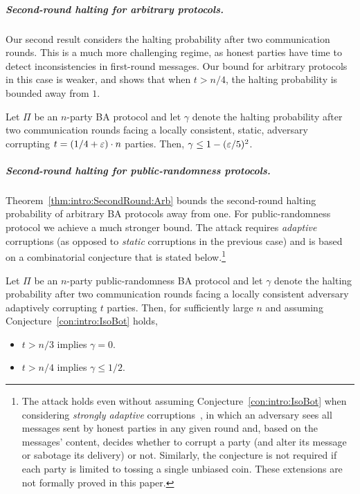 \subparagraph{Second-round halting for arbitrary protocols.}
Our second result considers the halting probability after two communication rounds.
This is a much more challenging regime, as honest parties have time to detect inconsistencies in first-round messages. Our bound for arbitrary protocols in this case is weaker, and shows that when $t>n/4$, the halting probability is bounded away from $1$.

\begin{theorem}\label{thm:intro:SecondRound:Arb}
Let $\Pi$ be an $n$-party BA protocol and let $\gamma$ denote the halting probability after two communication rounds facing a locally consistent, static, adversary corrupting $t=(1/4+\varepsilon)\cdot n$ parties.
Then, $\gamma \le 1 - (\varepsilon /5)^2$.
\end{theorem}

\subparagraph{Second-round halting for public-randomness protocols.}
Theorem~\ref{thm:intro:SecondRound:Arb} bounds the second-round halting probability of arbitrary BA protocols away from one. For public-randomness protocol we achieve a much stronger bound. The attack requires \emph{adaptive} corruptions (as opposed to \emph{static} corruptions in the previous case) and is based on a combinatorial conjecture that is stated below.\footnote{The attack holds even without assuming Conjecture~\ref{con:intro:IsoBot} when considering \emph{strongly adaptive} corruptions~\cite{GKP15}, in which an adversary sees all messages sent by honest parties in any given round and, based on the messages' content, decides whether to corrupt a party (and alter its message or sabotage its delivery) or not. Similarly, the conjecture is not required if each party is limited to tossing a single unbiased coin. These extensions are not formally proved in this paper.\label{footnote:no_conjecture}}

\begin{theorem}\label{thm:intro:SecondRound:PR}
Let $\Pi$ be an $n$-party public-randomness BA protocol and let $\gamma$ denote the halting probability after two communication rounds facing a locally consistent adversary adaptively corrupting $t$ parties.
Then, for sufficiently large $n$ and assuming Conjecture~\ref{con:intro:IsoBot} holds,
\begin{itemize}
\item $t > n/3$ implies $\gamma=0$.
\item $t > n/4$ implies $\gamma \leq 1/2$.
\end{itemize}
\end{theorem}

